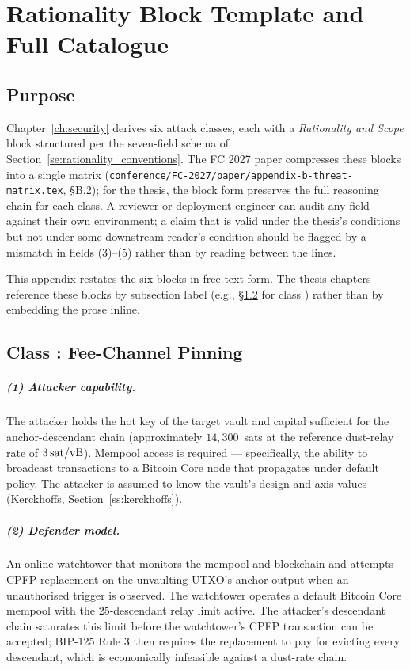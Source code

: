 \chapter{Rationality Block Template and Full Catalogue}
\label{app:rationality}

\section{Purpose}
\label{app:rat:purpose}

Chapter~\ref{ch:security} derives six attack classes, each with a
\emph{Rationality and Scope} block structured per the seven-field
schema of Section~\ref{se:rationality_conventions}. The FC 2027 paper
compresses these blocks into a single matrix
(\texttt{conference/FC-2027/paper/appendix-b-threat-matrix.tex},
§B.2); for the thesis, the block form preserves the full reasoning
chain for each class. A reviewer or deployment engineer can audit
any field against their own environment; a claim that is valid under
the thesis's conditions but not under some downstream reader's
condition should be flagged by a mismatch in fields (3)--(5) rather
than by reading between the lines.

This appendix restates the six blocks in free-text form. The thesis
chapters reference these blocks by subsection label (e.g.,
\S\ref{app:rat:classfee} for class \classfee{}) rather than by
embedding the prose inline.

\section{Class \classfee{}: Fee-Channel Pinning}
\label{app:rat:classfee}

\paragraph{(1) Attacker capability.}
The attacker holds the hot key of the target vault and capital
sufficient for the anchor-descendant chain (approximately
$14{,}300$~sats at the reference dust-relay rate of $3\,\text{sat/vB}{}$).
Mempool access is required --- specifically, the ability to broadcast
transactions to a Bitcoin Core node that propagates under default
policy. The attacker is assumed to know the vault's design and axis
values (Kerckhoffs, Section~\ref{ss:kerckhoffs}).

\paragraph{(2) Defender model.}
An online watchtower that monitors the mempool and blockchain and
attempts CPFP replacement on the unvaulting UTXO's anchor output when
an unauthorised trigger is observed. The watchtower operates a
default Bitcoin Core mempool with the $25$-descendant relay limit
active. The attacker's descendant chain saturates this limit before
the watchtower's CPFP transaction can be accepted; BIP-125 Rule 3
then requires the replacement to pay for evicting every descendant,
which is economically infeasible against a dust-rate chain.

